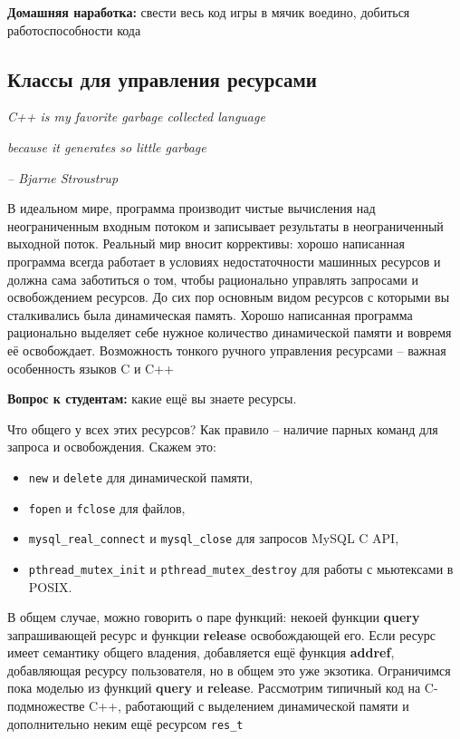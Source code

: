 \documentclass[a4paper,12pt,oneside]{article}
\newif\ifanswers
\begin{document}
\textbf{Домашняя наработка:} свести весь код игры в мячик воедино, добиться работоспособности кода

\pagebreak
\subsection{Классы для управления ресурсами}\label{WrapClasses}

\hfill\textit{C++ is my favorite garbage collected language}

\hfill\textit{because it generates so little garbage}{\vspace{0.5em}}

\hfill\textit{-- Bjarne Stroustrup}

В идеальном мире, программа производит чистые вычисления над неограниченным входным потоком и записывает результаты в неограниченный выходной поток. Реальный мир вносит коррективы: хорошо написанная программа всегда работает в условиях недостаточности машинных ресурсов и должна сама заботиться о том, чтобы рационально управлять запросами и освобождением ресурсов. До сих пор основным видом ресурсов с которыми вы сталкивались была динамическая память. Хорошо написанная программа рационально выделяет себе нужное количество динамической памяти и вовремя её освобождает. Возможность тонкого ручного управления ресурсами -- важная особенность языков C и C++

\textbf{Вопрос к студентам:} какие ещё вы знаете ресурсы.

\ifanswers
Ожидаемые ответы: файловые дескрипторы, мьютексы, шрифты и кисти, объекты гуя, соединения с бд, сокеты.
\fi

Что общего у всех этих ресурсов? Как правило -- наличие парных команд для запроса и освобождения. 
Скажем это: 
\begin{itemize}
\item
\lstinline!new! и \lstinline!delete! для динамической памяти, 
\item
\lstinline!fopen! и \lstinline!fclose! для файлов, 
\item
\lstinline!mysql_real_connect! и \lstinline!mysql_close! для запросов MySQL C API, 
\item
\lstinline!pthread_mutex_init! и \lstinline!pthread_mutex_destroy! для работы с мьютексами в POSIX. 
\end{itemize}

В общем случае, можно говорить о паре функций: некоей функции \textbf{query} запрашивающей ресурс и функции \textbf{release} освобождающей его. Если ресурс имеет семантику общего владения, добавляется ещё функция \textbf{addref}, добавляющая ресурсу пользователя, но в общем это уже экзотика. Ограничимся пока моделью из функций \textbf{query} и \textbf{release}. Рассмотрим типичный код на C-подмножестве C++, работающий с выделением динамической памяти и дополнительно неким ещё ресурсом \lstinline!res_t!
\end{document}
